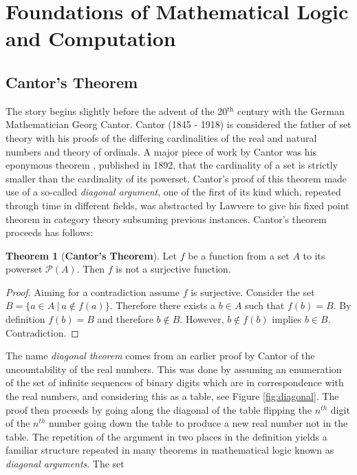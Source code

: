 \theoremstyle{definition}
\newtheorem{theorem}{Theorem}
\newtheorem{definition}{Definition}

\section{Foundations of Mathematical Logic and Computation}

\subsection{Cantor's Theorem}

The story begins slightly before the advent of the 20$^{\textrm{th}}$ century
with the German Mathematician Georg Cantor. Cantor (1845 - 1918) is considered
the father of set theory with his proofs of the differing cardinalities of the
real and natural numbers and theory of ordinals. A major piece of work by Cantor
was his eponymous theorem \cite{cantor1892ueber}, published in 1892, that the
cardinality of a set is strictly smaller than the cardinality of its powerset.
Cantor's proof of this theorem made use of a so-called \textit{diagonal
argument}, one of the first of its kind which, repeated through time in
different fields, was abstracted by Lawvere to give his fixed point theorem in
category theory subsuming previous instances. Cantor's theorem proceeds has
follows:

\begin{theorem}[\textbf{Cantor's Theorem}]
    Let $f$ be a function from a set $A$ to its powerset $\mathcal{P}(A)$. Then
    $f$ is not a surjective function.
\end{theorem}

\begin{proof}
    Aiming for a contradiction assume $f$ is surjective. Consider the set $B =
    \{ a \in A \: | \: a \not\in f(a) \}$. Therefore there exists a $b \in A$
    such that $f(b)=B$. By definition $f(b) = B$ and therefore $b \not\in B$.
    However, $b \not\in f(b)$ implies $b \in B$. Contradiction.
\end{proof}

The name \textit{diagonal theorem} comes from an earlier proof by Cantor of the
uncountability of the real numbers. This was done by assuming an enumeration of
the set of infinite sequences of binary digits which are in correspondence with
the real numbers, and considering this as a table, see Figure
\ref{fig:diagonal}. The proof then proceeds by going along the diagonal of the
table flipping the $n^{th}$ digit of the $n^{th}$ number going down the table to
produce a new real number not in the table. The repetition of the argument in
two places in the definition yields a familiar structure repeated in many
theorems in mathematical logic known as \textit{diagonal arguments}. The set

